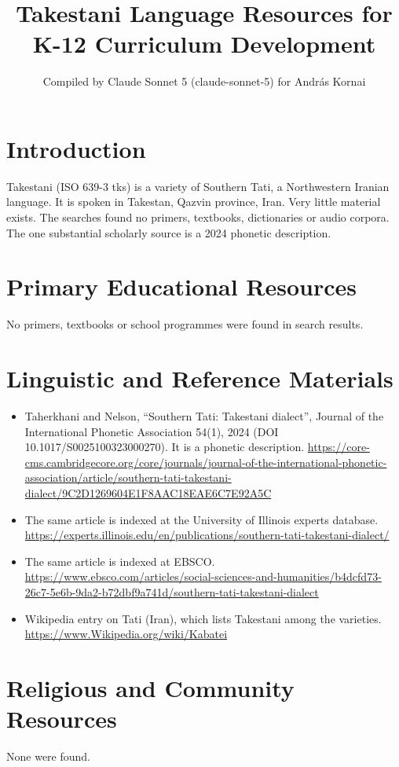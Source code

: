 \documentclass[12pt]{article}
\title{Takestani Language Resources for K-12 Curriculum Development}
\author{Compiled by Claude Sonnet 5 (claude-sonnet-5) for Andr\'as Kornai}
\date{}
\begin{document}
\maketitle

\section{Introduction}
Takestani (ISO 639-3 tks) is a variety of Southern Tati, a Northwestern Iranian language. It is spoken in Takestan, Qazvin province, Iran. Very little material exists. The searches found no primers, textbooks, dictionaries or audio corpora. The one substantial scholarly source is a 2024 phonetic description.

\section{Primary Educational Resources}
No primers, textbooks or school programmes were found in search results.

\section{Linguistic and Reference Materials}
\begin{itemize}
\item Taherkhani and Nelson, ``Southern Tati: Takestani dialect'', Journal of the International Phonetic Association 54(1), 2024 (DOI 10.1017/S0025100323000270). It is a phonetic description. \url{https://core-cms.cambridgecore.org/core/journals/journal-of-the-international-phonetic-association/article/southern-tati-takestani-dialect/9C2D1269604E1F8AAC18EAE6C7E92A5C}
\item The same article is indexed at the University of Illinois experts database. \url{https://experts.illinois.edu/en/publications/southern-tati-takestani-dialect/}
\item The same article is indexed at EBSCO. \url{https://www.ebsco.com/articles/social-sciences-and-humanities/b4dcfd73-26c7-5e6b-9da2-b72dbf9a741d/southern-tati-takestani-dialect}
\item Wikipedia entry on Tati (Iran), which lists Takestani among the varieties. \url{https://www.Wikipedia.org/wiki/Kabatei}
\end{itemize}

\section{Religious and Community Resources}
None were found.
\end{document}
